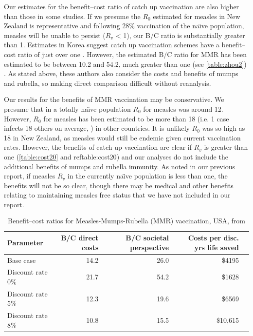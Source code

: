 \documentclass{article}
\begin{document}
Our estimates for the benefit--cost ratio of catch up vaccination are also higher than those in some studies. If we presume the $R_0$ estimated for measles in New Zealand is representative and following 28\% vaccination of the na\"{\i}ve population, measles will be unable to persist ($R_v$ < 1), our B/C ratio is substantially greater than 1. Estimates in Korea suggest catch up vaccination schemes have a benefit--cost ratio of just over one \citep{bae13}. However,  the estimated B/C ratio for MMR has been estimated to be between 10.2 and 54.2, much greater than one (see \autoref{table:zhou2}) \citep{zhou4}. As stated above, these authors also consider the costs and benefits of mumps and rubella, so making direct comparison difficult without reanalysis.

Our results for the benefits of MMR vaccination may be conservative. We presume that in a totally na\"{\i}ve population $R_0$ for measles was around 12. However, $R_0$ for measles has been estimated to be more than 18 (i.e. 1 case infects 18 others on average, \citep{anderson91}) in other countries. It is unlikely $R_0$ was so high as 18 in New Zealand, as measles would still be endemic given current vaccination rates. However, the benefits of catch up vaccination are clear if $R_v$ is greater than one (\autoref{table:cost20} and ref{table:cost20}) and our analyses do not include the additional benefits of mumps and rubella immunity. As noted in our previous report, if measles $R_v$ in the currently na\"{\i}ve population is less than one, the benefits will not be so clear, though there may be medical and other benefits relating to maintaining measles free status that we have not included in our report.

\begin{table}
\begin{center}
\begin{tabular}{lrrrr}
\hline
Parameter & B/C direct costs & B/C societal perspective & Costs per disc. yrs life saved\\
\hline
Base case & 14.2 & 26.0 & \$4195 \\
Discount rate 0\% & 21.7 & 54.2 & \$1628 \\
Discount rate 5\% & 12.3 & 19.6 & \$6569 \\
Discount rate 8\% & 10.8 & 15.5 & \$10,615 \\
\hline
\end{tabular}
\end{center}
\caption{Benefit--cost ratios for Measles-Mumps-Rubella (MMR) vaccination, USA, from \citep{zhou4}}
\label{table:zhou2}
\end{table}%
\end{document}
